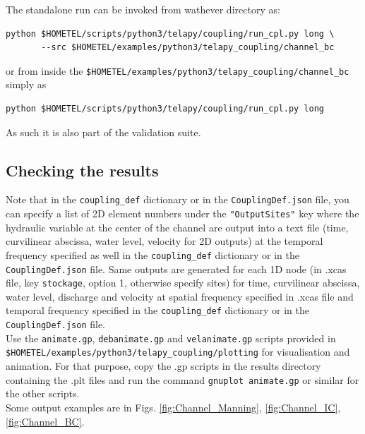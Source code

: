 The standalone run can be invoked from wathever
directory as:
\begin{verbatim}
python $HOMETEL/scripts/python3/telapy/coupling/run_cpl.py long \
       --src $HOMETEL/examples/python3/telapy_coupling/channel_bc
\end{verbatim}
or from inside the
\texttt{\$HOMETEL/examples/python3/telapy\_coupling/channel\_bc}
simply as
\begin{verbatim}
python $HOMETEL/scripts/python3/telapy/coupling/run_cpl.py long
\end{verbatim}
As such it is also part of the validation suite.

\subsection{Checking the results}
Note that in the \texttt{coupling\_def} dictionary or in the
\texttt{CouplingDef.json} file, you can specify a
list of 2D element numbers under the \texttt{"OutputSites"} key where
the hydraulic variable at the center of the channel are output into a
text file (time, curvilinear abscissa, water level, velocity for 2D
outputs) at the temporal frequency specified as well in the
\texttt{coupling\_def} dictionary or in the
\texttt{CouplingDef.json} file. Same outputs are generated for each 1D
node (in .xcas file, key \texttt{stockage}, option 1, otherwise
specify sites) for
time, curvilinear abscissa, water level, discharge and velocity at
spatial frequency specified in .xcas file and temporal frequency
specified in the \texttt{coupling\_def} dictionary or in the
\texttt{CouplingDef.json} file.\\

Use the \texttt{animate.gp}, \texttt{debanimate.gp} and \texttt{velanimate.gp}
scripts provided in\\
\texttt{\$HOMETEL/examples/python3/telapy\_coupling/plotting} for
visualisation and animation.
For that purpose, copy the .gp scripts in the results directory
containing the .plt files and run the command \texttt{gnuplot
  animate.gp} or similar for the other scripts.\\
Some output examples are in Figs. \ref{fig:Channel_Manning}, \ref{fig:Channel_IC}, \ref{fig:Channel_BC}.

